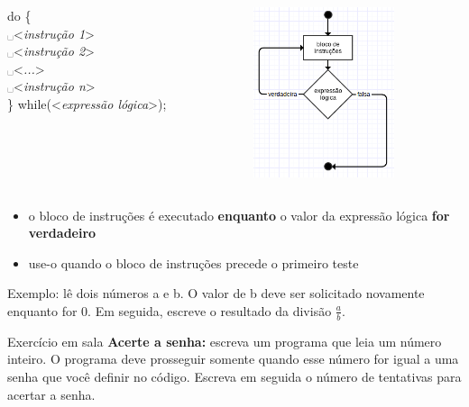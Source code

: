 \documentclass[portuguese,10pt,xcolor=table]{bredelebeamer}
\def\exp[#1]{\color{gray}<\textit{#1}>\color{black}}
\def\espaco{\color{gray}\hspace{0.2cm}\color{black}}
\def\espaco{\color{blue}␣\color{black}}
\begin{document}
    \begin{frame}
		\begin{columns}[t]
			\begin{column}[T]{.6\textwidth}
				do \{\\
				\espaco \exp[instrução 1]\\
				\espaco \exp[instrução 2]\\
				\espaco \exp[...]\\
				\espaco \exp[instrução n]\\
				\} while(\exp[expressão lógica]);
			\end{column}
							\begin{column}[T]{.4\textwidth}
								\includegraphics[height=5.0cm]{fluxogramaDoWhile.png}
							\end{column}
		\end{columns}
		\begin{itemize}
			\item o bloco de instruções é executado  \textbf{enquanto} o valor da expressão lógica \textbf{for verdadeiro}
			\item use-o quando o bloco de instruções precede o primeiro teste
		\end{itemize}
	\end{frame}

    \begin{frame}
	    Exemplo: lê dois números a e b. O valor de b deve ser solicitado novamente enquanto for 0. Em seguida, escreve o resultado da divisão $\frac{a}{b}$.
			
		
	\end{frame}


	\begin{frame}
	\begin{alertblock}{ Exercício em sala}
	\textbf{Acerte a senha: } escreva um programa que leia um número inteiro. O programa deve prosseguir somente quando esse número for igual a uma senha que você definir no código. Escreva em seguida o número de tentativas para acertar a senha.
	\end{alertblock}
	\end{frame}
\end{document}
